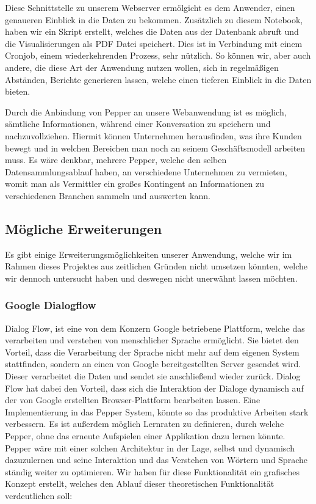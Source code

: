 Diese Schnittstelle zu unserem Webserver ermölgicht es dem Anwender, einen genaueren Einblick in die Daten zu bekommen. Zusätzlich zu diesem Notebook, haben wir ein Skript erstellt, welches die Daten aus der Datenbank abruft und die Visualisierungen als PDF Datei speichert. Dies ist in Verbindung mit einem Cronjob, einem wiederkehrenden Prozess, sehr nützlich. So können wir, aber auch andere, die diese Art der Anwendung nutzen wollen, sich in regelmäßigen Abständen, Berichte generieren lassen, welche einen tieferen Einblick in die Daten bieten.

Durch die Anbindung von Pepper an unsere Webanwendung ist es möglich, sämtliche Informationen, während einer Konversation zu speichern und nachzuvollziehen. Hiermit können Unternehmen herausfinden, was ihre Kunden bewegt und in welchen Bereichen man noch an seinem Geschäftsmodell arbeiten muss. Es wäre denkbar, mehrere Pepper, welche den selben Datensammlungsablauf haben, an verschiedene Unternehmen zu vermieten, womit man als Vermittler ein großes Kontingent an Informationen zu verschiedenen Branchen sammeln und auswerten kann.\\

\subsection{Mögliche Erweiterungen}

Es gibt einige Erweiterungsmöglichkeiten unserer Anwendung, welche wir im Rahmen dieses Projektes aus zeitlichen Gründen nicht umsetzen könnten, welche wir dennoch untersucht haben und deswegen nicht unerwähnt lassen möchten.

\subsubsection{Google Dialogflow}

Dialog Flow, ist eine von dem Konzern Google betriebene Plattform, welche das verarbeiten und verstehen von menschlicher Sprache ermöglicht. Sie bietet den Vorteil, dass die Verarbeitung der Sprache nicht mehr auf dem eigenen System stattfinden, sondern an einen von Google bereitgestellten Server gesendet wird. Dieser verarbeitet die Daten und sendet sie anschließend wieder zurück. Dialog Flow hat dabei den Vorteil, dass sich die Interaktion der Dialoge dynamisch auf der von Google erstellten Browser-Plattform bearbeiten lassen. Eine Implementierung in das Pepper System, könnte so das produktive Arbeiten stark verbessern. Es ist außerdem möglich Lernraten zu definieren, durch welche Pepper, ohne das erneute Aufspielen einer Applikation dazu lernen könnte. Pepper wäre mit einer solchen Architektur in der Lage, selbst und dynamisch dazuzulernen und seine Interaktion und das Verstehen von Wörtern und Sprache ständig weiter zu optimieren. Wir haben für diese Funktionalität ein grafisches Konzept erstellt, welches den Ablauf dieser theoretischen Funktionalität verdeutlichen soll:

